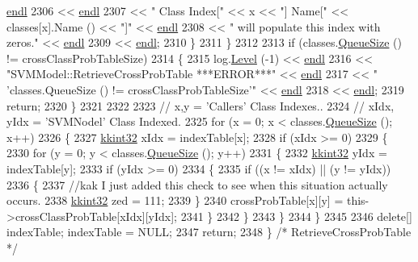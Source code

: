 \begin{DoxyCode}
      \hyperlink{namespace_k_k_b_ad1f50f65af6adc8fa9e6f62d007818a8}{endl}
2306                      << \hyperlink{namespace_k_k_b_ad1f50f65af6adc8fa9e6f62d007818a8}{endl}
2307                      << \textcolor{stringliteral}{"      Class Index["} << x << \textcolor{stringliteral}{"]  Name["} << classes[x].Name () << \textcolor{stringliteral}{"]"} << 
      \hyperlink{namespace_k_k_b_ad1f50f65af6adc8fa9e6f62d007818a8}{endl}
2308                      << \textcolor{stringliteral}{"      will populate this index with zeros."}                         << 
      \hyperlink{namespace_k_k_b_ad1f50f65af6adc8fa9e6f62d007818a8}{endl}
2309                      << \hyperlink{namespace_k_k_b_ad1f50f65af6adc8fa9e6f62d007818a8}{endl};
2310     \}
2311   \}
2312 
2313   \textcolor{keywordflow}{if}  (classes.\hyperlink{class_k_k_b_1_1_k_k_queue_a1dab601f75ee6a65d97f02bddf71c40d}{QueueSize} () != crossClassProbTableSize)
2314   \{
2315     log.\hyperlink{class_k_k_b_1_1_run_log_a32cf761d7f2e747465fd80533fdbb659}{Level} (-1) << \hyperlink{namespace_k_k_b_ad1f50f65af6adc8fa9e6f62d007818a8}{endl}
2316                    << \textcolor{stringliteral}{"SVMModel::RetrieveCrossProbTable      ***ERROR***"}                                  
           << \hyperlink{namespace_k_k_b_ad1f50f65af6adc8fa9e6f62d007818a8}{endl}
2317                    << \textcolor{stringliteral}{"                                     'classes.QueueSize () !=
       crossClassProbTableSize'"}  << \hyperlink{namespace_k_k_b_ad1f50f65af6adc8fa9e6f62d007818a8}{endl}
2318                    << \hyperlink{namespace_k_k_b_ad1f50f65af6adc8fa9e6f62d007818a8}{endl};
2319     \textcolor{keywordflow}{return};
2320   \}
2321 
2322 
2323   \textcolor{comment}{// x,y         = 'Callers'   Class Indexes..}
2324   \textcolor{comment}{// xIdx, yIdx  = 'SVMNodel'  Class Indexed.}
2325   \textcolor{keywordflow}{for}  (x = 0;  x < classes.\hyperlink{class_k_k_b_1_1_k_k_queue_a1dab601f75ee6a65d97f02bddf71c40d}{QueueSize} ();  x++)
2326   \{
2327     \hyperlink{namespace_k_k_b_a8fa4952cc84fda1de4bec1fbdd8d5b1b}{kkint32} xIdx = indexTable[x];
2328     \textcolor{keywordflow}{if}  (xIdx >= 0)
2329     \{
2330       \textcolor{keywordflow}{for}  (y = 0;  y < classes.\hyperlink{class_k_k_b_1_1_k_k_queue_a1dab601f75ee6a65d97f02bddf71c40d}{QueueSize} ();  y++)
2331       \{
2332         \hyperlink{namespace_k_k_b_a8fa4952cc84fda1de4bec1fbdd8d5b1b}{kkint32}  yIdx = indexTable[y];
2333         \textcolor{keywordflow}{if}  (yIdx >= 0)
2334         \{
2335           \textcolor{keywordflow}{if}  ((x != xIdx)  ||  (y != yIdx))
2336           \{
2337             \textcolor{comment}{//kak  I just added this check to see when this situation actually occurs.}
2338             \hyperlink{namespace_k_k_b_a8fa4952cc84fda1de4bec1fbdd8d5b1b}{kkint32} zed = 111;
2339           \}
2340           crossProbTable[x][y] = this->crossClassProbTable[xIdx][yIdx];
2341         \}
2342       \}
2343     \}
2344   \}
2345 
2346   \textcolor{keyword}{delete}[]  indexTable;  indexTable = NULL;
2347   \textcolor{keywordflow}{return};
2348 \}  \textcolor{comment}{/* RetrieveCrossProbTable */}
\end{DoxyCode}
